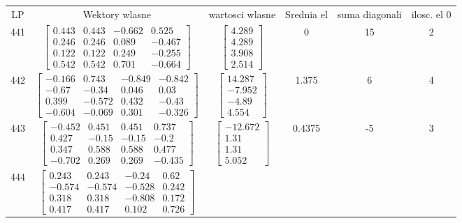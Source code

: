 \documentclass[a4paper,12pt]{article}
\begin{document}
\bgroup {} \vspace{0.2in} \begin{tabular}{c c c c c c}
LP &Wektory wlasne & wartosci wlasne & Srednia el & suma diagonali & ilosc. el 0\\
441
&
$\begin{bmatrix} 0.443 & 0.443 & -0.662 & 0.525 \\ 0.246 & 0.246 & 0.089 & -0.467 \\ 0.122 & 0.122 & 0.249 & -0.255 \\ 0.542 & 0.542 & 0.701 & -0.664 \end{bmatrix}$
&
$\begin{bmatrix} 4.289 \\ 4.289 \\ 3.908 \\ 2.514 \end{bmatrix}$
&
0
&
15
&
2
\\
442
&
$\begin{bmatrix} -0.166 & 0.743 & -0.849 & -0.842 \\ -0.67 & -0.34 & 0.046 & 0.03 \\ 0.399 & -0.572 & 0.432 & -0.43 \\ -0.604 & -0.069 & 0.301 & -0.326 \end{bmatrix}$
&
$\begin{bmatrix} 14.287 \\ -7.952 \\ -4.89 \\ 4.554 \end{bmatrix}$
&
1.375
&
6
&
4
\\
443
&
$\begin{bmatrix} -0.452 & 0.451 & 0.451 & 0.737 \\ 0.427 & -0.15 & -0.15 & -0.2 \\ 0.347 & 0.588 & 0.588 & 0.477 \\ -0.702 & 0.269 & 0.269 & -0.435 \end{bmatrix}$
&
$\begin{bmatrix} -12.672 \\ 1.31 \\ 1.31 \\ 5.052 \end{bmatrix}$
&
0.4375
&
-5
&
3
\\
444
&
$\begin{bmatrix} 0.243 & 0.243 & -0.24 & 0.62 \\ -0.574 & -0.574 & -0.528 & 0.242 \\ 0.318 & 0.318 & -0.808 & 0.172 \\ 0.417 & 0.417 & 0.102 & 0.726 \end{bmatrix}$

\end{tabular}
\end{document}

